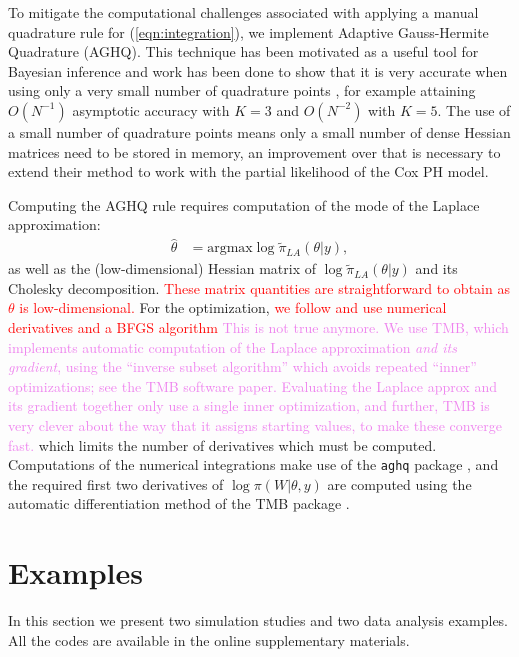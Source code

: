 \documentclass[ba]{imsart}
\newcommand{\highlight}[1]{\textcolor{red}{#1}}
\newcommand{\alex}[1]{\textcolor{violet}{{ }#1}}
\begin{document}
To mitigate the computational challenges associated with applying a manual quadrature rule for (\ref{eqn:integration}), we implement Adaptive Gauss-Hermite Quadrature (AGHQ). This technique has been motivated as a useful tool for Bayesian inference \citep{nayloradaptive} and work has been done to show that it is very accurate when using only a very small number of quadrature points \citep{adaptive_GH_1994,adaptive_GH_2020}, for example attaining $O(N^{-1})$ asymptotic accuracy with $K = 3$ and $O(N^{-2})$ with $K = 5$. The use of a small number of quadrature points means only a small number of dense Hessian matrices need to be stored in memory, an improvement over \cite{casecross} that is necessary to extend their method to work with the partial likelihood of the Cox PH model.

Computing the AGHQ rule requires computation of the mode of the Laplace approximation:
\begin{equation}\begin{aligned}
\widehat{\theta} &= \text{argmax}\log\widetilde{\pi}_{LA}(\theta|y),
\end{aligned}\end{equation}
as well as the (low-dimensional) Hessian matrix of $\log\widetilde{\pi}_{LA}(\theta|y)$ and its Cholesky decomposition. \highlight{These matrix quantities are straightforward to obtain as $\theta$ is low-dimensional.} For the optimization, \highlight{we follow \citet{inla} and use numerical derivatives and a BFGS algorithm}\alex{This is not true anymore. We use TMB, which implements automatic computation of the Laplace approximation \emph{and its gradient}, using the ``inverse subset algorithm'' which avoids repeated ``inner'' optimizations; see the TMB software paper. Evaluating the Laplace approx and its gradient together only use a single inner optimization, and further, TMB is very clever about the way that it assigns starting values, to make these converge fast.} which limits the number of derivatives which must be computed. Computations of the numerical integrations make use of the \texttt{aghq} package \citep{stringeraghqpackage}, and the required first two derivatives of $\log\pi(W|\theta,y)$ are computed using the automatic differentiation method of the TMB package \citep{tmb}.


\section{Examples}\label{sec:example}

In this section we present two simulation studies and two data analysis examples. All the codes are available in the online supplementary materials.
\end{document}
